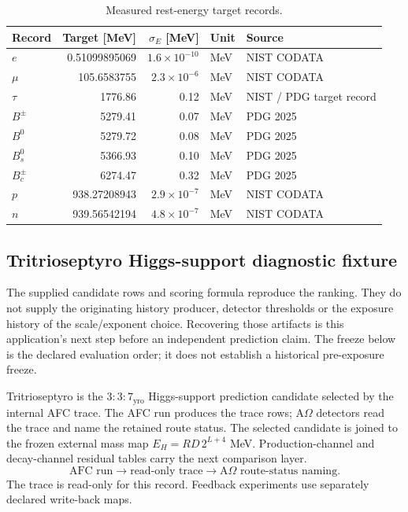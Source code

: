 \begin{table}[H]
\centering
\scriptsize
\caption{Measured rest-energy target records.}
\begin{tabularx}{\textwidth}{l r r l l}
\toprule
Record & Target [MeV] & \(\sigma_E\) [MeV] & Unit & Source\\
\midrule
\(e\) & 0.51099895069 & \(1.6\times10^{-10}\) & MeV & NIST CODATA\\
\(\mu\) & 105.6583755 & \(2.3\times10^{-6}\) & MeV & NIST CODATA\\
\(\tau\) & 1776.86 & 0.12 & MeV & NIST / PDG target record\\
\(B^\pm\) & 5279.41 & 0.07 & MeV & PDG 2025\\
\(B^0\) & 5279.72 & 0.08 & MeV & PDG 2025\\
\(B_s^0\) & 5366.93 & 0.10 & MeV & PDG 2025\\
\(B_c^\pm\) & 6274.47 & 0.32 & MeV & PDG 2025\\
\(p\) & 938.27208943 & \(2.9\times10^{-7}\) & MeV & NIST CODATA\\
\(n\) & 939.56542194 & \(4.8\times10^{-7}\) & MeV & NIST CODATA\\
\bottomrule
\end{tabularx}
\label{tab:manual-measured-comparison-analysis}
\end{table}



\subsection{Tritrioseptyro Higgs-support diagnostic fixture}\label{manual:tritrioseptyro-higgs-support-fixture}
The supplied candidate rows and scoring formula reproduce the ranking. They
do not supply the originating history producer, detector thresholds or the
exposure history of the scale/exponent choice. Recovering those artifacts is
this application's next step before an independent prediction claim. The
freeze below is the declared evaluation order; it does not establish a
historical pre-exposure freeze.

Tritrioseptyro is the \(3{:}3{:}7_{\mathrm{yro}}\) Higgs-support prediction candidate selected by the internal AFC trace. The AFC run produces the trace rows; A\(\Omega\) detectors read the trace and name the retained route status. The selected candidate is joined to the frozen external mass map \(E_H=RD\,2^{L+4}\) MeV. Production-channel and decay-channel residual tables carry the next comparison layer.
\[
\text{AFC run}\longrightarrow \text{read-only trace}\longrightarrow \text{A\(\Omega\) route-status naming}.
\]
The trace is read-only for this record. Feedback experiments use separately declared write-back maps.

